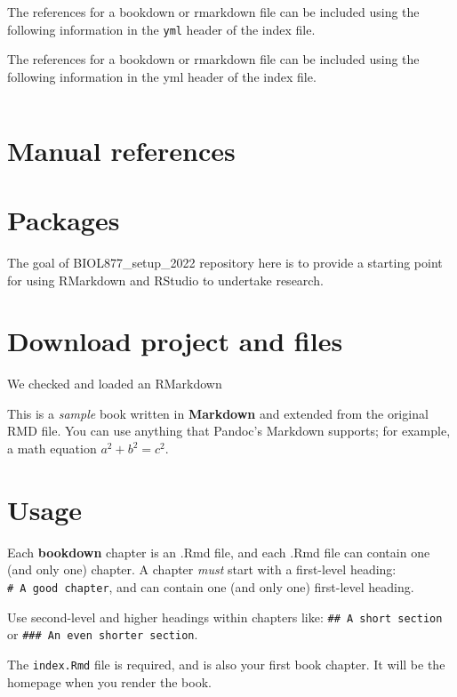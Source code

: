 \documentclass[
]{book}
\begin{document}
The references for a bookdown or rmarkdown file can be included using the following information in the \texttt{yml} header of the index file.

The references for a bookdown or rmarkdown file can be included using the following information in the yml header of the index file.

\begin{verbatim}
\end{verbatim}

\hypertarget{manual-references}{%
\section{Manual references}\label{manual-references}}

\hypertarget{packages}{%
\section{Packages}\label{packages}}

The goal of BIOL877\_setup\_2022 repository here is to provide a starting point for using RMarkdown and RStudio to undertake research.

\hypertarget{download-project-and-files}{%
\section{Download project and files}\label{download-project-and-files}}

We checked and loaded an RMarkdown

This is a \emph{sample} book written in \textbf{Markdown} and extended from the original RMD file. You can use anything that Pandoc's Markdown supports; for example, a math equation \(a^2 + b^2 = c^2\).

\hypertarget{usage}{%
\section{Usage}\label{usage}}

Each \textbf{bookdown} chapter is an .Rmd file, and each .Rmd file can contain one (and only one) chapter. A chapter \emph{must} start with a first-level heading: \texttt{\#\ A\ good\ chapter}, and can contain one (and only one) first-level heading.

Use second-level and higher headings within chapters like: \texttt{\#\#\ A\ short\ section} or \texttt{\#\#\#\ An\ even\ shorter\ section}.

The \texttt{index.Rmd} file is required, and is also your first book chapter. It will be the homepage when you render the book.
\end{document}
